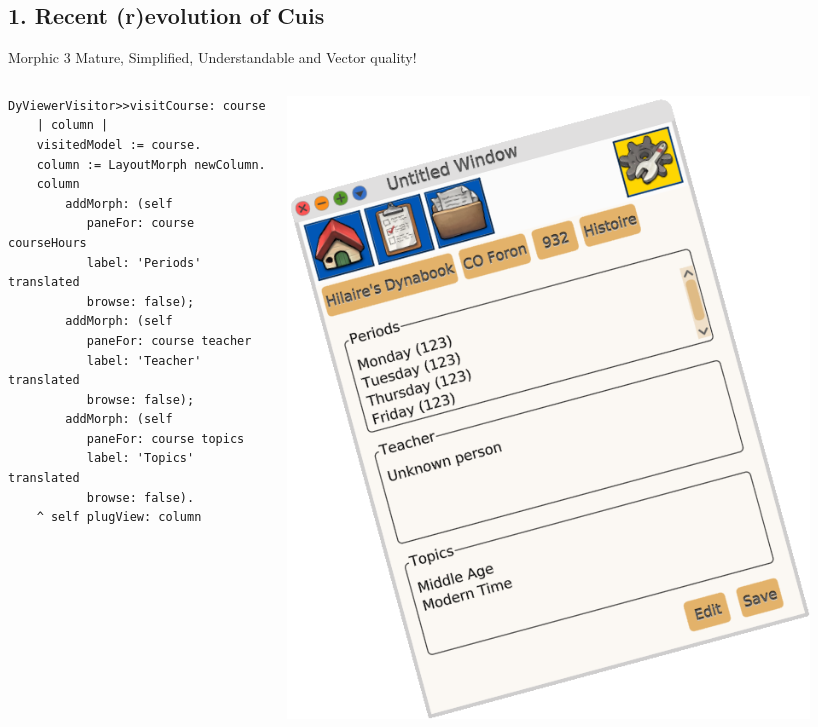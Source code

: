 \documentclass{beamer}
\begin{document}
\subsection{1. Recent (r)evolution of Cuis}
\begin{frame}[fragile]{Morphic 3}
Mature, Simplified, Understandable and Vector quality!
\begin{columns}[c]
  \begin{column}{0.5\textwidth}
    \fontsize{9pt}{8pt}\selectfont
    \begin{lstlisting}[language=Smalltalk]
DyViewerVisitor>>visitCourse: course
	| column |
	visitedModel := course.
	column := LayoutMorph newColumn.
	column
        addMorph: (self
           paneFor: course courseHours
           label: 'Periods' translated
           browse: false);
        addMorph: (self
           paneFor: course teacher
           label: 'Teacher' translated
           browse: false);
        addMorph: (self
           paneFor: course topics
           label: 'Topics' translated
           browse: false).
	^ self plugView: column
      \end{lstlisting}
    \end{column}    
    \begin{column}{0.5\textwidth}
      \includegraphics[width=0.9\textwidth]{CompiledLayout.png}
    \end{column}  
  \end{columns}
\end{frame}
\end{document}

